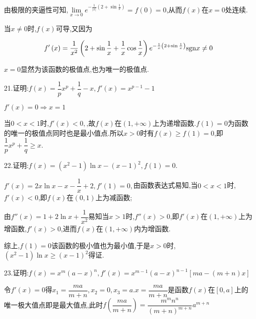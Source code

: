 由极限的夹逼性可知,$\lim\limits_{x \to 0}  {e^{ - \frac{1}{{\left| x \right|}}\left( {2 + \sin \frac{1}{x}} \right)}} = f\left( 0 \right) = 0$,从而$f\left( x \right)$在$x = 0$处连续.

当$x \ne 0$时,$f\left( x \right)$可导,又因为

$$f'\left( x \right) = \dfrac{1}{{{x^2}}}\left( {2 + \sin \dfrac{1}{x} + \dfrac{1}{x}\cos \dfrac{1}{x}} \right){e^{ - \frac{1}{x}\left( {2 + \sin \frac{1}{x}} \right)}}{\mathop{\rm sgn}} x \ne 0$$

$x = 0$显然为该函数的极值点,也为唯一的极值点.

21.证明:$f\left( x \right) = \dfrac{1}{p}{x^p} + \dfrac{1}{q} - x,f'\left( x \right) = {x^{p - 1}} - 1$

$f'\left( x \right) = 0 \Rightarrow x = 1$

当$0 < x < 1$时,$f'\left( x \right) < 0,$,故$f\left( x \right)$在$\left( {1, + \infty } \right)$上为递增函数.$f\left( 1 \right) = 0$为函数的唯一的极值点同时也是最小值点.所以$x > 0$时有$f\left( x \right) \ge f\left( 1 \right) = 0$,即$\dfrac{1}{p}{x^p} + \dfrac{1}{q} \ge x.$

22.证明:$f\left( x \right) = \left( {{x^2} - 1} \right)\ln x - {\left( {x - 1} \right)^2},f\left( 1 \right) = 0.$

$f'\left( x \right) = 2x\ln x - x - \dfrac{1}{x} + 2,f'\left( 1 \right) = 0,$由函数表达式易知,当$0 < x < 1$时,$f'\left( x \right) < 0$,即$f\left( x \right)$在$\left( {0,1} \right)$上为减函数;

由$f''\left( x \right) = 1 + 2\ln x + \dfrac{1}{{{x^2}}}$易知当$x > 1$时,$f''\left( x \right) > 0$,即$f'\left( x \right)$在$\left( {1, + \infty } \right)$上为增函数,$f'\left( x \right) > 0$,进而$f\left( x \right)$在$\left( {1, + \infty } \right)$内为增函数.

综上,$f\left( 1 \right) = 0$该函数的极小值也为最小值,于是$x > 0$时,$\left( {{x^2} - 1} \right)\ln x \ge {\left( {x - 1} \right)^2}$得证.

23.证明:$f\left( x \right) = {x^m}{\left( {a - x} \right)^n},f'\left( x \right) = {x^{m - 1}}{\left( {a - x} \right)^{n - 1}}\left[ {ma - \left( {m + n} \right)x} \right]$

令$f'\left( x \right) = 0$得${x_1} = \dfrac{{ma}}{{m + n}},{x_2} = 0,{x_3} = a$.$x = \dfrac{{ma}}{{m + n}}$是函数$f\left( x \right)$在$\left[ {0,a} \right]$上的唯一极大值点即是最大值点,此时$f\left( {\dfrac{{ma}}{{m + n}}} \right) = \dfrac{{{m^m}{n^n}}}{{{{\left( {m + n} \right)}^{m + n}}}}{a^{m + n}}$

